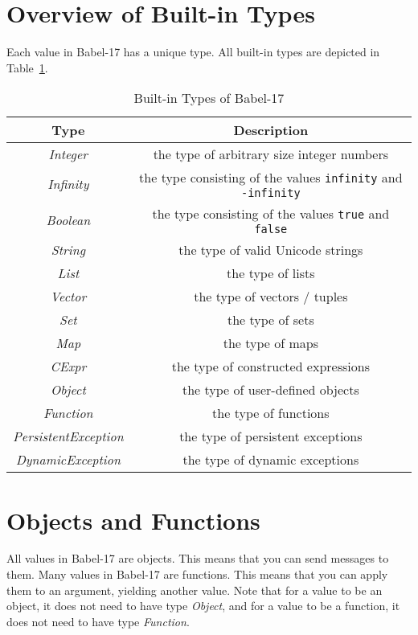 \documentclass[11pt]{amsart}
\newcommand{\metababel}[1] {\textsl{#1}}
\newcommand{\babelsrc}[1] {\lstinline!#1!}
\begin{document}
\section{Overview of Built-in Types}
Each value in Babel-17 has a unique type. All built-in types are depicted in Table~\ref{table:builtintypes}.
\begin{table}
\caption{Built-in Types of Babel-17}
\begin{tabular}{c|c}
\textbf{Type} & \textbf{Description}\\\hline
\metababel {Integer} & the type of arbitrary size integer numbers\\
\metababel{Infinity} & the type consisting of the values \babelsrc{infinity} and \babelsrc{-infinity}\\
\metababel{Boolean} & the type consisting of the values \babelsrc{true} and \babelsrc{false}\\
\metababel{String} & the type of valid Unicode strings\\
\metababel{List} & the type of lists\\
\metababel{Vector} & the type of vectors / tuples\\
\metababel{Set} & the type of sets \\
\metababel{Map}& the type of maps \\
\metababel{CExpr} & the type of constructed expressions\\
\metababel{Object} & the type of user-defined objects\\
\metababel{Function} & the type of  functions\\
\metababel{PersistentException} & the type of persistent exceptions\\
\metababel{DynamicException} & the type of dynamic exceptions\\
\end{tabular}
\label{table:builtintypes}
\end{table}

\section{Objects and Functions}
All values in Babel-17 are objects. This means that you can send messages to them. Many values in Babel-17 are functions. This means that you can apply them to an argument, yielding another value. Note that for a value to be an object, it does not need to have type \metababel{Object}, and for a value to be a function,  it does not need to have type \metababel{Function}. 
\end{document}
